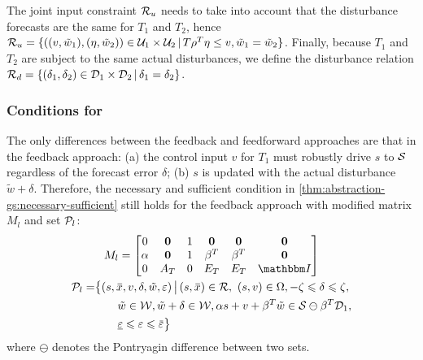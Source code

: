 %
The joint input constraint $\mathcal{R}_{u}$ needs to take into account that the disturbance forecasts are the same for $T_{1}$ and $T_2$, hence $\mathcal{R}_{u} = \{ ((v, \tilde{w}_{1}), (\eta, \tilde{w}_{2})) \in \mathcal{U}_{1} \times \mathcal{U}_{2} \,|\, T \rho^{T} \eta \leq v, \tilde{w}_{1} = \tilde{w}_{2} \}$.
Finally, because $T_{1}$ and $T_{2}$ are subject to the same actual disturbances, we define the disturbance relation $\mathcal{R}_{d} = \{ (\delta_{1}, \delta_{2}) \in \mathcal{D}_{1} \times \mathcal{D}_{2} \,|\, \delta_{1} = \delta_{2} \}$.

\subsubsection{Conditions for \RSet} %
\label{sec:abstraction-gs:feedback:conditions}

The only differences between the feedback and feedforward approaches are that in the feedback approach: (a) the control input $v$ for $T_{1}$ must robustly drive $s$ to $\mathcal{S}$ regardless of the forecast error $\delta$; (b) $s$ is updated with the actual disturbance $\tilde{w} + \delta$.
Therefore, the necessary and sufficient condition in \cref{thm:abstraction-gs:necessary-sufficient} still holds for the feedback approach with modified matrix $M_{l}$ and set $\mathcal{P}_{l}$:
\begin{gather*}
  M_l =
  \begin{bmatrix}
    0 & \Zero & 1 & \Zero & \Zero & \Zero \\
    \alpha & \Zero & 1 & \beta^{T} & \beta^{T} & \Zero \\
    0 & A_T & 0 & E_T & E_T & \IdentityMatrix
  \end{bmatrix}\\
  \begin{aligned}
    \PSet_l =& \big\{ (s,\overbar{x}, v, \delta, \tilde{w}, \varepsilon) \,\big|\,
    (s,\overbar{x}) \in \RSet,\ (s,v) \in \Omega, -\zeta \leqslant \delta \leqslant \zeta,\big.\\
    &\qquad \big. \tilde{w} \in \WSet, \tilde{w} + \delta \in \WSet, \alpha s + v + \beta^{T} \tilde{w} \in \SSet \ominus \beta^{T} \mathcal{D}_{1},\\
    &\qquad \underline{\varepsilon} \leqslant \varepsilon \leqslant \overbar{\varepsilon} \big\}
  \end{aligned}
\end{gather*}
where $\ominus$ denotes the Pontryagin difference between two sets.


